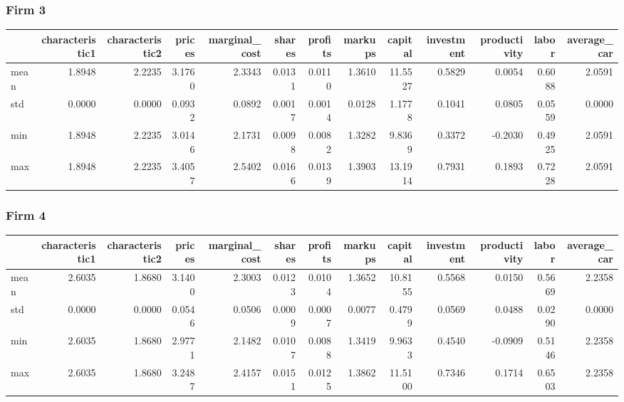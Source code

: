  \subsubsection*{Firm 3}
\begin{tabular}{lrrrrrrrrrrrr}
\toprule
{} &  characteristic1 &  characteristic2 &  prices &  marginal\_cost &  shares &  profits &  markups &  capital &  investment &  productivity &  labor &  average\_car \\
\midrule
mean &           1.8948 &           2.2235 &  3.1760 &         2.3343 &  0.0131 &   0.0110 &   1.3610 &  11.5527 &      0.5829 &        0.0054 & 0.6088 &       2.0591 \\
std  &           0.0000 &           0.0000 &  0.0932 &         0.0892 &  0.0017 &   0.0014 &   0.0128 &   1.1778 &      0.1041 &        0.0805 & 0.0559 &       0.0000 \\
min  &           1.8948 &           2.2235 &  3.0146 &         2.1731 &  0.0098 &   0.0082 &   1.3282 &   9.8369 &      0.3372 &       -0.2030 & 0.4925 &       2.0591 \\
max  &           1.8948 &           2.2235 &  3.4057 &         2.5402 &  0.0166 &   0.0139 &   1.3903 &  13.1914 &      0.7931 &        0.1893 & 0.7228 &       2.0591 \\
\bottomrule
\end{tabular}


 \subsubsection*{Firm 4}
\begin{tabular}{lrrrrrrrrrrrr}
\toprule
{} &  characteristic1 &  characteristic2 &  prices &  marginal\_cost &  shares &  profits &  markups &  capital &  investment &  productivity &  labor &  average\_car \\
\midrule
mean &           2.6035 &           1.8680 &  3.1400 &         2.3003 &  0.0123 &   0.0104 &   1.3652 &  10.8155 &      0.5568 &        0.0150 & 0.5669 &       2.2358 \\
std  &           0.0000 &           0.0000 &  0.0546 &         0.0506 &  0.0009 &   0.0007 &   0.0077 &   0.4799 &      0.0569 &        0.0488 & 0.0290 &       0.0000 \\
min  &           2.6035 &           1.8680 &  2.9771 &         2.1482 &  0.0107 &   0.0088 &   1.3419 &   9.9633 &      0.4540 &       -0.0909 & 0.5146 &       2.2358 \\
max  &           2.6035 &           1.8680 &  3.2487 &         2.4157 &  0.0151 &   0.0125 &   1.3862 &  11.5100 &      0.7346 &        0.1714 & 0.6503 &       2.2358 \\
\bottomrule
\end{tabular}


